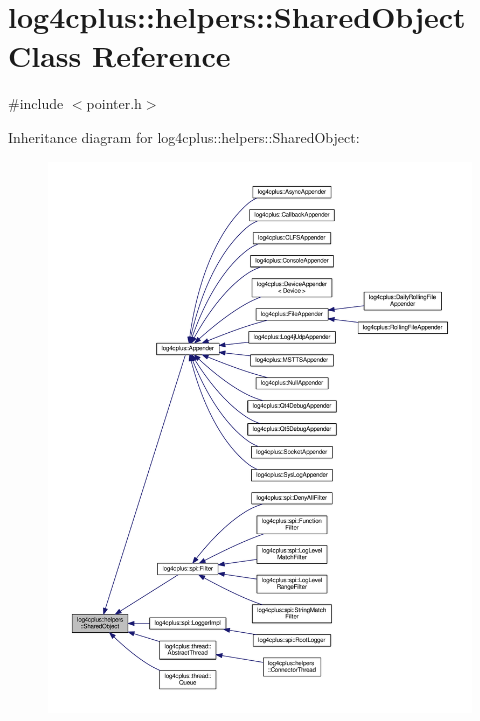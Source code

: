 \hypertarget{classlog4cplus_1_1helpers_1_1SharedObject}{\section{log4cplus\-:\-:helpers\-:\-:Shared\-Object Class Reference}
\label{classlog4cplus_1_1helpers_1_1SharedObject}
}


{\ttfamily \#include $<$pointer.\-h$>$}



Inheritance diagram for log4cplus\-:\-:helpers\-:\-:Shared\-Object\-:
\nopagebreak
\begin{figure}[H]
\begin{center}
\leavevmode
\includegraphics[width=350pt]{classlog4cplus_1_1helpers_1_1SharedObject__inherit__graph}
\end{center}
\end{figure}



